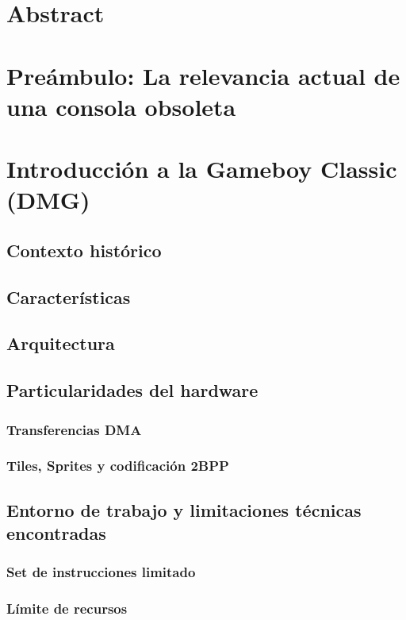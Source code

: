 \documentclass[12pt]{article}
\begin{document}


\tableofcontents
\newpage

\section{Abstract}

\section{Preámbulo: La relevancia actual de una consola obsoleta}

\section{Introducción a la Gameboy Classic (DMG)}
    \subsection{Contexto histórico}
    \subsection{Características}
    \subsection{Arquitectura}
    \subsection{Particularidades del hardware}
        \subsubsection{Transferencias DMA}
        \subsubsection{Tiles, Sprites y codificación 2BPP}
    \subsection{Entorno de trabajo y limitaciones técnicas encontradas}
        \subsubsection{Set de instrucciones limitado}
        \subsubsection{Límite de recursos}
\end{document}
